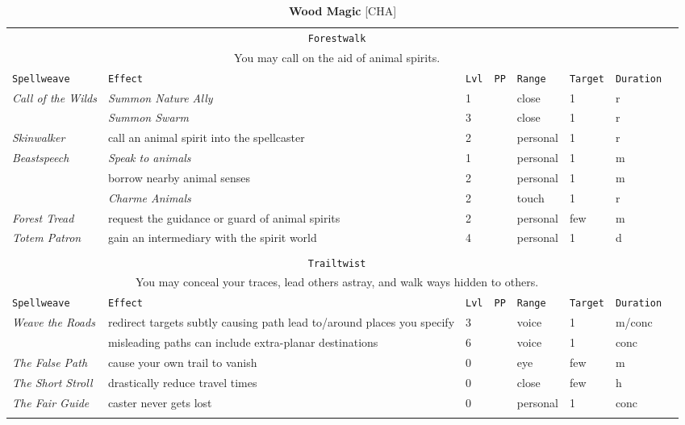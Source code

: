\documentclass[10pt,a4paper]{article}
\begin{document}
\newpage
\begin{table}[htbp!]
\caption*{\textbf{\Large{Wood Magic}} [CHA]}
\begin{tabular}{llllllll}
   \multicolumn{7}{c}{\texttt{Forestwalk}}\\
  \multicolumn{7}{c}{You may call on the aid of animal spirits.}\\
    \hline
 \texttt{Spellweave} & \texttt{Effect} & \texttt{Lvl} & \texttt{PP} & \texttt{Range} & \texttt{Target} & \texttt{Duration} \\
    \hline
    \multirow{1}{*}{\textit{Call of the Wilds}} & \textit{Summon Nature Ally} & 1 && close & 1 & r\\
										        & \textit{Summon Swarm} & 3 && close & 1 & r\\
    \hline
    \multirow{1}{*}{\textit{Skinwalker}}& call an animal spirit into the spellcaster & 2 && personal & 1 & r\\
    \hline
    \multirow{1}{*}{\textit{Beastspeech}}& \textit{Speak to animals} & 1 && personal & 1 & m\\ 
									     & borrow nearby animal senses & 2 && personal & 1 & m\\ 
									     & \textit{Charme Animals} & 2 && touch & 1 & r\\ 
    \hline
    \multirow{1}{*}{\textit{Forest Tread}}& request the guidance or guard of animal spirits & 2 && personal & few & m\\
    \hline
    \multirow{1}{*}{\textit{Totem Patron}}& gain an intermediary with the spirit world & 4 && personal & 1 & d\\
   &&&&&&\\
   
   
   \multicolumn{7}{c}{\texttt{Trailtwist}}\\
  \multicolumn{7}{c}{You may conceal your traces, lead others astray, and walk ways hidden to others.}\\
    \hline
 \texttt{Spellweave} & \texttt{Effect} & \texttt{Lvl} & \texttt{PP} & \texttt{Range} & \texttt{Target} & \texttt{Duration} \\
    \hline
    \multirow{1}{*}{\textit{Weave the Roads}} & redirect targets subtly causing path lead to/around places you specify & 3 && voice & 1 & m/conc\\
										      & misleading paths can include extra-planar destinations & 6 && voice & 1 & conc\\
   \hline
    \multirow{1}{*}{\textit{The False Path}} & cause your own trail to vanish & 0 && eye & few & m\\
    \hline
    \multirow{1}{*}{\textit{The Short Stroll}} & drastically reduce travel times & 0 && close & few & h\\
    \hline
    \multirow{1}{*}{\textit{The Fair Guide}} & caster never gets lost & 0 && personal & 1 & conc\\
    &&&&&&\\
   

\end{tabular}
\end{table}
\end{document}
